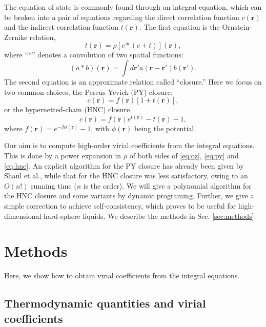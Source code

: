 \documentclass[aip,jcp,reprint,superscriptaddress]{revtex4-1}
\newcommand{\vct}[1]{\mathbf{#1}}
\providecommand{\vr}{} %
\renewcommand{\vr}{\vct{r}}
\newcommand{\secref}[1]{Sec. \ref{#1}}
\begin{document}
The equation of state is commonly found
  through an integral equation, which
  can be broken into a pair of equations
  regarding the direct correlation function $c(\vr)$
  and the indirect correlation function $t(\vr)$.
%
The first equation is the Ornstein-Zernike relation\cite{hansen},
\begin{equation}
  t(\vr) = \rho [c * (c + t)](\vr),
\label{eq:oz}
\end{equation}
%
where ``$*$'' denotes a convolution of two spatial functions:
\begin{equation*}
  (a * b)(\vr) = \int d\vr' a(\vr - \vr') b(\vr').
\label{eq:convol}
\end{equation*}
%
The second equation is an approximate relation called ``closure.''
%
Here we focus on two common choices,
%
the Percus-Yevick (PY) closure:
%
\begin{equation}
  c(\vr) = f(\vr) [1 + t(\vr)],
  \label{eq:py}
\end{equation}
%
or the hypernetted-chain (HNC) closure
%
\begin{equation}
  c(\vr) = f(\vr) e^{t(\vr)} - t(\vr) - 1,
  \label{eq:hnc}
\end{equation}
%
where
  $f(\vr) = e^{-\beta \phi(\vr)} - 1$,
with $\phi(\vr)$ being the potential.



Our aim is to compute high-order virial coefficients from
  the integral equations.
%
This is done by a power expansion in $\rho$ of both sides
  of \eqref{eq:oz}, \eqref{eq:py} and \eqref{eq:hnc}.
%
An explicit algorithm for the PY closure has already
  been given by Shaul et al.\cite{sspk},
  while that for the HNC closure was less satisfactory,
  owing to an $O(n!)$ running time ($n$ is the order).
%
We will give a polynomial algorithm for the HNC closure
  and some variants by dynamic programing.
%
Further, we give a simple correction to achieve self-consistency,
  which proves to be useful for high-dimensional hard-sphere liquids.
%
We describe the methods in \secref{sec:methods}.





\section{\label{sec:methods}Methods}

Here, we show how to obtain virial coefficients from the integral equations.

\subsection{Thermodynamic quantities and virial coefficients}
\end{document}
